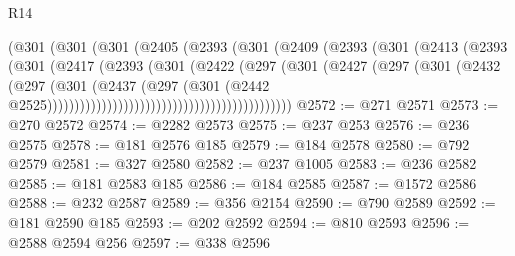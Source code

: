 \begin{lexlean}{R14}
\begin{coremodule}
                                      (@301
                                        (@301
                                          (@301
                                            (@2405
                                              (@2393
                                                (@301
                                                  (@2409
                                                    (@2393
                                                      (@301
                                                        (@2413
                                                          (@2393
                                                            (@301
                                                              (@2417
                                                                (@2393
                                                                  (@301
                                                                    (@2422
                                                                      (@297
                                                                        (@301
                                                                          (@2427
                                                                            (@297
                                                                              (@301
                                                                                (@2432
                                                                                  (@297
                                                                                    (@301
                                                                                      (@2437
                                                                                        (@297
                                                                                          (@301
                                                                                            (@2442
                                                                                              @2525)))))))))))))))))))))))))))))))))))))))))))))
@2572 := @271 @2571
@2573 := @270 @2572
@2574 := @2282 @2573
@2575 := @237 @253
@2576 := @236 @2575
@2578 := @181 @2576 @185
@2579 := @184 @2578
@2580 := @792 @2579
@2581 := @327 @2580
@2582 := @237 @1005
@2583 := @236 @2582
@2585 := @181 @2583 @185
@2586 := @184 @2585
@2587 := @1572 @2586
@2588 := @232 @2587
@2589 := @356 @2154
@2590 := @790 @2589
@2592 := @181 @2590 @185
@2593 := @202 @2592
@2594 := @810 @2593
@2596 := @2588 @2594 @256
@2597 := @338 @2596

\end{coremodule}
\end{lexlean}
